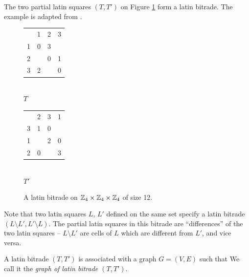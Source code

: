 \begin{exmp}
The two partial latin squares $(T, T')$ on Figure \ref{fig:latin-bitrade} form a latin bitrade. The example is adapted from \cite{Cavenagh08}.

\begin{figure}[htb]
	\centering
	\begin{minipage}{.30\linewidth}
		\begin{center}
		\begin{tabular}{| c c c c |}
			\hline
  & 1 & 2 & 3 \\
1 & 0 & 3 &   \\
2 &   & 0 & 1 \\
3 & 2 &   & 0 \\
			\hline
		\end{tabular} \\
		\bigskip
		$T$
		\end{center}
	\end{minipage}
	\begin{minipage}{.30\linewidth}
		\begin{center}
		\begin{tabular}{| c c c c |}
			\hline
  & 2 & 3 & 1 \\
3 & 1 & 0 &   \\
1 &   & 2 & 0 \\
2 & 0 &   & 3 \\
			\hline
		\end{tabular} \\
		\bigskip
		$T'$
		\end{center}
	\end{minipage}
	\caption{A latin bitrade on $\mathbb Z_4 \times \mathbb Z_4 \times \mathbb Z_4$ of size 12.}
	\label{fig:latin-bitrade}
\end{figure}

\end{exmp}%

Note that two latin squares $L$, $L'$ defined on the same set specify a latin bitrade $(L \setminus L', L' \setminus L)$. The partial latin squares in this bitrade are ``differences'' of the two latin squares -- $L\setminus L'$ are cells of $L$ which are different from $L'$, and vice versa.

\begin{defn}
A latin bitrade $(T, T')$ is associated with a graph $G = (V, E)$ such that
We call it the \emph{graph of latin bitrade $(T, T')$}.
\end{defn}

